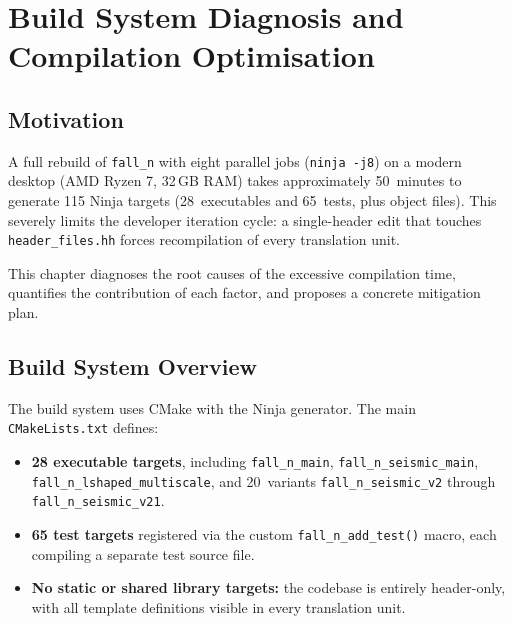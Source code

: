 
\chapter{Build System Diagnosis and Compilation Optimisation}
\label{ch:build-system-optimisation}


\section{Motivation}
\label{sec:build-motivation}

A full rebuild of \texttt{fall\_n} with eight parallel jobs
(\texttt{ninja -j8}) on a modern desktop (AMD Ryzen 7, 32\,GB RAM)
takes approximately 50~minutes to generate 115 Ninja targets
(28~executables and 65~tests, plus object files).  This severely
limits the developer iteration cycle: a single-header edit that
touches \texttt{header\_files.hh} forces recompilation of every
translation unit.

This chapter diagnoses the root causes of the excessive compilation
time, quantifies the contribution of each factor, and proposes a
concrete mitigation plan.


\section{Build System Overview}
\label{sec:build-overview}

The build system uses CMake with the Ninja generator.  The main
\texttt{CMakeLists.txt} defines:

\begin{itemize}
  \item \textbf{28 executable targets}, including
    \texttt{fall\_n\_main}, \texttt{fall\_n\_seismic\_main},
    \texttt{fall\_n\_lshaped\_multiscale}, and 20~variants
    \texttt{fall\_n\_seismic\_v2} through
    \texttt{fall\_n\_seismic\_v21}.
  \item \textbf{65 test targets} registered via the custom
    \texttt{fall\_n\_add\_test()} macro, each compiling a
    separate test source file.
  \item \textbf{No static or shared library targets:}
    the codebase is entirely header-only, with all template
    definitions visible in every translation unit.
\end{itemize}


